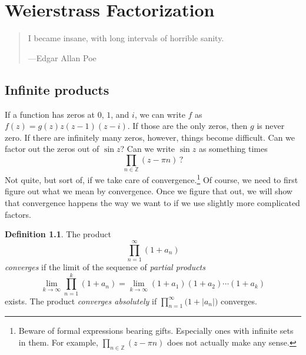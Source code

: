 \documentclass[12pt,openany]{book}
\newcommand{\sabs}[1]{\lvert {#1} \rvert}
\newcommand{\Z}{{\mathbb{Z}}}
\newcommand{\myindex}[1]{#1\index{#1}}
\theoremstyle{plain}
\theoremstyle{remark}
\theoremstyle{definition}
\newtheorem{defn}[thm]{Definition}
\newenvironment{myepigraph}{%
    \begin{quote}%
    \begingroup\itshape
}{%
    \endgroup%
    \end{quote}
}
\theoremstyle{exercise}
\theoremstyle{example}
\begin{document}

\chapter{Weierstrass Factorization} \label{ch:weier}

\begin{myepigraph}
I became insane, with long intervals of horrible sanity.

---Edgar Allan Poe
\end{myepigraph}


\section{Infinite products}
\label{sec:prod}

If a
function has zeros at $0$, $1$, and $i$, we
can write $f$ as
$f(z) = g(z) z(z-1)(z-i)$.  If those are the only zeros, then 
$g$ is never zero.  If there are infinitely many zeros, however,
things become difficult.
Can we factor out the zeros out of $\sin z$?  Can we
write $\sin z$ as something times
\begin{equation*}
\prod_{n \in \Z} (z-\pi n) \, ?
\end{equation*}
Not quite, but sort of, if
we take care of convergence.\footnote{Beware of
formal expressions bearing gifts.
Especially ones with infinite sets in them.
For example, $\prod_{n \in \Z} (z-\pi n)$ does not actually make any sense.}
Of course, we need to first
figure out what we mean by convergence.  Once we figure that out,
we will show that convergence happens the way we want to
if we use slightly more complicated factors.

\begin{defn}
The product
%
\begin{equation*}
\prod_{n=1}^\infty (1+a_n)
\end{equation*}
\emph{converges} if the limit of the
sequence of \emph{\myindex{partial products}}
\begin{equation*}
\lim_{k\to \infty}
\prod_{n=1}^k (1+a_n) =
\lim_{k\to \infty}
(1+a_1)(1+a_2) \cdots (1+a_k)
\end{equation*}
exists.
The product
\emph{converges absolutely}
if $\prod_{n=1}^\infty \bigl(1+\sabs{a_n}\bigr)$
converges.
\end{defn}
\end{document}
